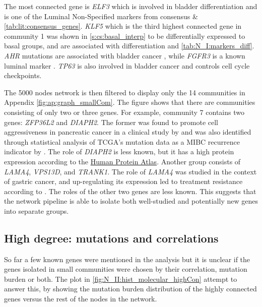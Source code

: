 The most connected gene is \textit{ELF3} which is involved in bladder differentiation and is one of the Luminal Non-Specified markers from consensus \citep{Kamoun2020-tj} \& \cref{tab:lit:consensus_genes}. \textit{KLF5} which is the third highest connected gene in community 1 was shown in \cref{s:cs:basal_interp} to be differentially expressed to basal groups, and are associated with differentiation \citep{Bell2011-xj} and \cref{tab:N_I:markers_diff}. \textit{AHR} mutations are associated with bladder cancer \citep{Shi2020-km}, while \textit{FGFR3} is a known luminal marker \citep{Robertson2017-mg}. \textit{TP63} is also involved in bladder cancer \citep{Choi2012-kk, Karni-Schmidt2011-ps, Choi2014-ed} and controls cell cycle checkpoints.


The 5000 nodes network is then filtered to display only the 14 communities in Appendix \cref{fig:ap:graph_smallCom}. The figure shows that there are communities consisting of only two or three genes. For example, community 7 contains two genes: \textit{ZFP36L2} and \textit{DIAPH2}. The former was found to promote cell aggressiveness in pancreatic cancer in a clinical study by \citet{Yonemori2017-ky} and was also identified through statistical analysis of TCGA's mutation data as a MIBC recurrence indicator by \citet{Han2019-ma}. The role of \textit{DIAPH2} is less known, but it has a high protein expression according to the \href{https://www.proteinatlas.org/ENSG00000147202-DIAPH2/tissue}{Human Protein Atlas}. Another group consists of \textit{LAMA4}, \textit{VPS13D}, and \textit{TRANK1}. The role of \textit{LAMA4} was studied in the context of gastric cancer, and up-regulating its expression led to treatment resistance according to \citet{Peng2020-xe}. The roles of the other two genes are less known. This suggests that the network pipeline is able to isolate both well-studied and potentially new genes into separate groups.


\subsection{High degree: mutations and correlations} \label{s:N_II:corr_mut_burden}

So far a few known genes were mentioned in the analysis but it is unclear if the genes isolated in small communities were chosen by their correlation, mutation burden or both. The plot in \cref{fig:N_II:hist_molecular_highCon} attempt to answer this, by showing the mutation burden distribution of the highly connected genes versus the rest of the nodes in the network.

